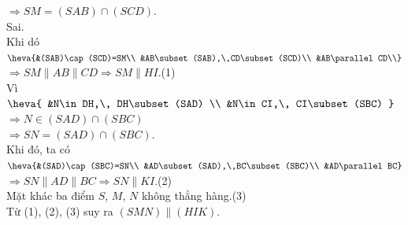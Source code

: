 \begin{ex}
{\begin{itemchoice}
			$\Rightarrow SM=(SAB)\cap  (SCD)$.\\
			\itemch Sai.\\ 
			Khi dó  $\heva{&(SAB)\cap(SCD)=SM\\ &AB\subset(SAB),\,CD\subset(SCD)\\ &AB\parallel CD\\}$
			$\Rightarrow SM\parallel AB\parallel CD\Rightarrow SM\parallel  HI$.\quad (1)\\
			 Vì $\heva{
			 &N\in DH,\, DH\subset (SAD) \\
			&N\in CI,\, CI\subset (SBC) } $ $\Rightarrow  N\in (SAD)\cap (SBC)$\\
			 $\Rightarrow SN=(SAD)\cap (SBC).$\\
			Khi đó,  ta có
			$\heva{&(SAD)\cap (SBC)=SN\\ &AD\subset(SAD),\,BC\subset(SBC)\\ &AD\parallel BC}$ $\Rightarrow SN\parallel AD\parallel BC\Rightarrow SN\parallel  KI$.\quad (2)\\
			Mặt khác ba điểm  $S$, $M$, $N$ không thẳng hàng.\quad (3)\\
			 Từ (1), (2), (3) suy ra $(SMN)\parallel (HIK)$.
		\end{itemchoice}
	} 
\end{ex}

